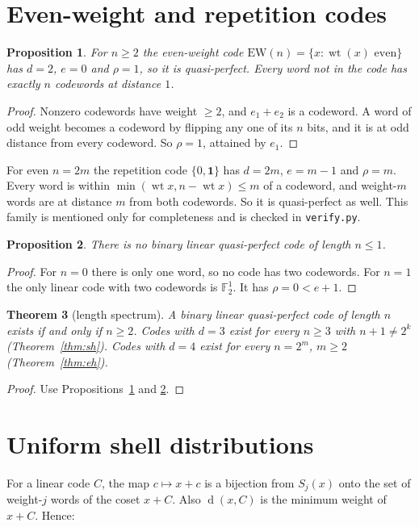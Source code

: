 \documentclass[11pt]{article}
\newtheorem{theorem}{Theorem}
\newtheorem{proposition}[theorem]{Proposition}
\theoremstyle{definition}
\theoremstyle{remark}
\newcommand{\F}{\mathbb{F}_2}
\newcommand{\wt}{\operatorname{wt}}
\newcommand{\dd}{\operatorname{d}}
\begin{document}
\section{Even-weight and repetition codes}
\begin{proposition}\label{prop:ew}
For $n\ge 2$ the even-weight code $\mathrm{EW}(n)=\{x:\wt(x)\text{ even}\}$ has
$d=2$, $e=0$ and $\rho=1$, so it is quasi-perfect. Every word not in the code
has exactly $n$ codewords at distance $1$.
\end{proposition}
\begin{proof}
Nonzero codewords have weight $\ge 2$, and $e_1+e_2$ is a codeword. A word
of odd weight becomes a codeword by flipping any one of its $n$ bits, and it is
at odd distance from every codeword. So $\rho=1$, attained by $e_1$.
\end{proof}

For even $n=2m$ the repetition code $\{0,\mathbf 1\}$ has $d=2m$, $e=m-1$ and
$\rho=m$. Every word is within $\min(\wt x,n-\wt x)\le m$ of a codeword, and
weight-$m$ words are at distance $m$ from both codewords. So it is
quasi-perfect as well. This family is mentioned only for completeness and is
checked in \texttt{verify.py}.

\begin{proposition}\label{prop:short}
There is no binary linear quasi-perfect code of length $n\le 1$.
\end{proposition}
\begin{proof}
For $n=0$ there is only one word, so no code has two codewords. For $n=1$ the
only linear code with two codewords is $\F^1$. It has $\rho=0<e+1$.
\end{proof}

\begin{theorem}[length spectrum]\label{thm:spec}
A binary linear quasi-perfect code of length $n$ exists if and only if $n\ge 2$.
Codes with $d=3$ exist for every $n\ge 3$ with $n+1\ne 2^k$
(Theorem~\ref{thm:sh}). Codes with $d=4$ exist for every $n=2^m$, $m\ge 2$
(Theorem~\ref{thm:eh}).
\end{theorem}
\begin{proof}
Use Propositions~\ref{prop:ew} and \ref{prop:short}.
\end{proof}

\section{Uniform shell distributions}\label{sec:uniform}
For a linear code $C$, the map $c\mapsto x+c$ is a bijection from $S_j(x)$ onto
the set of weight-$j$ words of the coset $x+C$. Also $\dd(x,C)$ is the minimum
weight of $x+C$. Hence:
\end{document}
